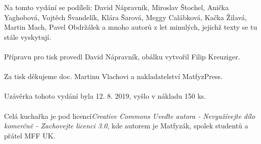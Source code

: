 \setcounter{page}{0}
\tableofcontents
{}
\vspace*{\fill}
\noindent Na tomto vydání se podíleli: David Nápravník, Miroslav Štochel,
Anička Yaghobová, Vojtěch Švandelík, Klára Šarová, Meggy Calábková, 
Kačka Žilavá, Martin Mach, Pavel Obdržálek
a mnoho autorů z let minulých, jejichž texty se tu stále vyskytují.
\\\\
Přípravu pro tisk provedl David Nápravník, obálku vytvořil Filip Kreuziger.
\\\\
Za tisk děkujeme doc. Martinu Vlachovi a nakladatelství MatfyzPress.
\\\\
Uzávěrka tohoto vydání byla 12. 8. 2019, vyšlo v nákladu 150 ks.
\\\\
Celá kuchařka je pod licencí\textit{Creative Commons Uveďte autora -
Nevyužívejte dílo komerčně - Zachovejte licenci 3.0}, kde autorem je Matfyzák,
spolek studentů a přátel MFF UK.
\newpage
{}